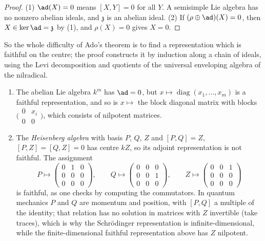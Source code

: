\begin{proof}
(1) $\ad(X) = 0$ means $[X, Y] = 0$ for all $Y$. A semisimple Lie algebra has no nonzero abelian ideals, and $\mathfrak{z}$ is an abelian ideal. (2) If
$(\rho \oplus \ad)(X) = 0$, then $X \in \ker\ad = \mathfrak{z}$ by (1), and $\rho(X) = 0$ gives $X = 0$.
\end{proof}

So the whole difficulty of Ado's theorem is to find a representation which is faithful on the centre; the proof constructs it by induction along a chain of ideals,
using the Levi decomposition and quotients of the universal enveloping algebra of the nilradical.

\begin{example}\label{lie-groups:example-ado}
\begin{enumerate}
\item The abelian Lie algebra $k^m$ has $\ad = 0$, but $x \mapsto \operatorname{diag}(x_1, \ldots, x_m)$ is a faithful representation, and so is $x \mapsto$ the
block diagonal matrix with blocks $\bigl(\begin{smallmatrix}0 & x_i\\ 0 & 0\end{smallmatrix}\bigr)$, which consists of nilpotent matrices.
\item The \emph{Heisenberg algebra} with basis $P$, $Q$, $Z$ and $[P, Q] = Z$, $[P, Z] = [Q, Z] = 0$ has centre $kZ$, so its adjoint representation is not faithful.
The assignment
\[
P \mapsto \begin{pmatrix}0 & 1 & 0\\ 0 & 0 & 0\\ 0 & 0 & 0\end{pmatrix}, \qquad Q \mapsto \begin{pmatrix}0 & 0 & 0\\ 0 & 0 & 1\\ 0 & 0 & 0\end{pmatrix}, \qquad Z \mapsto \begin{pmatrix}0 & 0 & 1\\ 0 & 0 & 0\\ 0 & 0 & 0\end{pmatrix}
\]
is faithful, as one checks by computing the commutators. In quantum mechanics $P$ and $Q$ are momentum and position, with $[P, Q]$ a multiple of the identity; that
relation has no solution in matrices with $Z$ invertible (take traces), which is why the Schr\"odinger representation is infinite-dimensional, while the
finite-dimensional faithful representation above has $Z$ nilpotent.

\end{enumerate}
\end{example}
